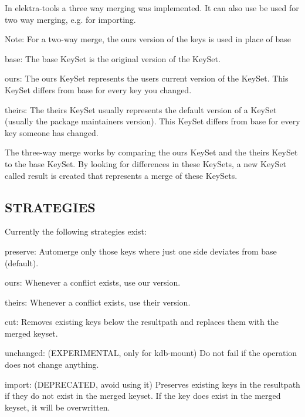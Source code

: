 In elektra-\/tools a three way merging was implemented. It can also use be used for two way merging, e.\+g. for importing.

Note\+: For a two-\/way merge, the {\ttfamily ours} version of the keys is used in place of {\ttfamily base}


\begin{DoxyItemize}
\item {\ttfamily base}\+: The {\ttfamily base} Key\+Set is the original version of the Key\+Set.
\item {\ttfamily ours}\+: The {\ttfamily ours} Key\+Set represents the user\textquotesingle{}s current version of the Key\+Set. This Key\+Set differs from {\ttfamily base} for every key you changed.
\item {\ttfamily theirs}\+: The {\ttfamily theirs} Key\+Set usually represents the default version of a Key\+Set (usually the package maintainer\textquotesingle{}s version). This Key\+Set differs from {\ttfamily base} for every key someone has changed.
\end{DoxyItemize}

The three-\/way merge works by comparing the {\ttfamily ours} Key\+Set and the {\ttfamily theirs} Key\+Set to the {\ttfamily base} Key\+Set. By looking for differences in these Key\+Sets, a new Key\+Set called {\ttfamily result} is created that represents a merge of these Key\+Sets.

\subsection*{S\+T\+R\+A\+T\+E\+G\+I\+ES}

Currently the following strategies exist\+:


\begin{DoxyItemize}
\item preserve\+: Automerge only those keys where just one side deviates from base (default).
\item ours\+: Whenever a conflict exists, use our version.
\item theirs\+: Whenever a conflict exists, use their version.
\item cut\+: Removes existing keys below the resultpath and replaces them with the merged keyset.
\item unchanged\+: (E\+X\+P\+E\+R\+I\+M\+E\+N\+T\+AL, only for kdb-\/mount) Do not fail if the operation does not change anything.
\item import\+: (D\+E\+P\+R\+E\+C\+A\+T\+ED, avoid using it) Preserves existing keys in the resultpath if they do not exist in the merged keyset. If the key does exist in the merged keyset, it will be overwritten. 
\end{DoxyItemize}